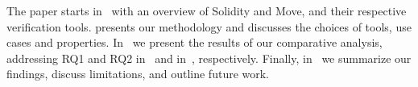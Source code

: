 %

The paper starts in~ with an overview of Solidity and Move, and their respective verification tools. 
 presents our methodology and discusses the choices of tools, use cases and properties. 
In~ we present the results of our comparative analysis, addressing RQ1 and RQ2 in~ and in~, respectively. 
Finally, in~ we summarize our findings, discuss limitations, and outline future work.

